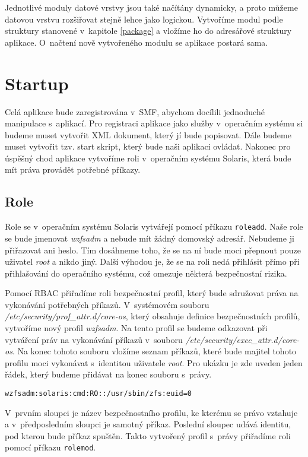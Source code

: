 Jednotlivé moduly datové vrstvy jsou také načítány dynamicky, a proto můžeme datovou vrstvu rozšiřovat stejně lehce jako logickou. Vytvoříme modul podle struktury stanovené v~kapitole \ref{package} a vložíme ho do adresářové struktury aplikace. O~načtení nově vytvořeného modulu se aplikace postará sama.

\section{Startup}
Celá aplikace bude zaregistrována v~SMF, abychom docílili jednoduché manipulace s~aplikací. Pro registraci aplikace jako služby v~operačním systému si budeme muset vytvořit XML dokument, který jí bude popisovat. Dále budeme muset vytvořit tzv. start skript, který bude naši aplikaci ovládat. Nakonec pro úspěšný chod aplikace vytvoříme roli v~operačním systému Solaris, která bude mít práva provádět potřebné příkazy.
\subsection{Role}
Role se v~operačním systému Solaris vytvářejí pomocí příkazu \verb|roleadd|. Naše role se bude jmenovat \emph{wzfsadm} a nebude mít žádný domovský adresář. Nebudeme ji přiřazovat ani heslo. Tím dosáhneme toho, že se na ní bude moci přepnout pouze uživatel \emph{root} a nikdo jiný. Další výhodou je, že se na roli nedá přihlásit přímo při přihlašování do operačního systému, což omezuje některá bezpečnostní rizika.

Pomocí RBAC přiřadíme roli bezpečnostní profil, který bude sdružovat práva na vykonávání potřebných příkazů. V~systémovém souboru \emph{/etc/\-se\-cu\-ri\-ty/\-prof\_attr.d/\-core-os}, který obsahuje definice bezpečnostních profilů, vytvoříme nový profil \emph{wzfsadm}. Na tento profil se budeme odkazovat při vytváření práv na vykonávání příkazů v~souboru \emph{/etc/\-se\-cu\-ri\-ty/\-exec\_attr.d/\-core-os}. Na konec tohoto souboru vložíme seznam příkazů, které bude majitel tohoto profilu moci vykonávat s~identitou uživatele \emph{root}. Pro ukázku je zde uveden jeden řádek, který budeme přidávat na konec souboru s~právy.
\begin{verbatim}
wzfsadm:solaris:cmd:RO::/usr/sbin/zfs:euid=0
\end{verbatim}
V~prvním sloupci je název bezpečnostního profilu, ke kterému se právo vztahuje a v~předposledním sloupci je samotný příkaz. Poslední sloupec udává identitu, pod kterou bude příkaz spuštěn. Takto vytvořený profil s~právy přiřadíme roli pomocí příkazu \verb|rolemod|.
